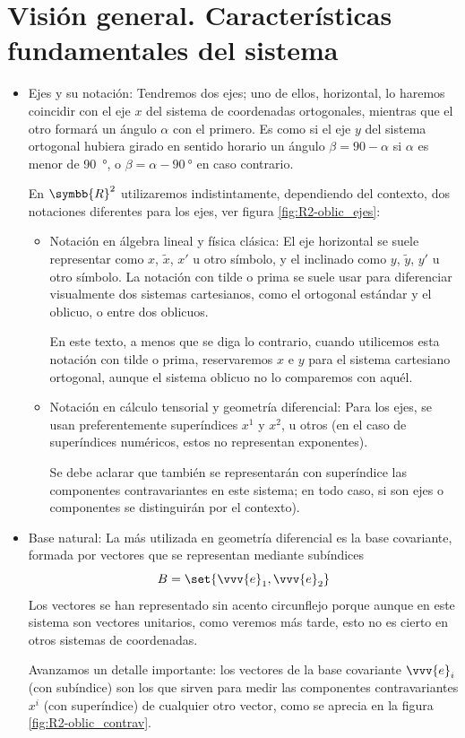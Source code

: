 \section{Visión general. Características fundamentales del sistema}
\label{sect:R2-oblic_vision_general}
\begin{itemize}
\item Ejes y su notación:
  Tendremos dos ejes; uno de ellos, horizontal, lo haremos coincidir con el eje $x$
  del sistema de coordenadas ortogonales, mientras que el otro formará un ángulo $\alpha$
  con el primero. Es como si el eje $y$ del sistema ortogonal hubiera girado en sentido
  horario un ángulo $\beta = \qty{90}-\alpha$ si $\alpha$ es menor de \qty{90}{\degree}, o
  $\beta = \alpha - \qty{90}{\degree}$ en caso contrario.
  
  En $\symbb{R}^2$ utilizaremos indistintamente, dependiendo del contexto, dos
  notaciones diferentes para los ejes, ver figura \ref{fig:R2-oblic_ejes}:
  \begin{itemize}
  \item Notación en álgebra lineal y física clásica:
    El eje horizontal se suele representar como $x$, $\tilde{x}$, $x'$ u otro símbolo, y
    el     inclinado como $y$, $\tilde{y}$, $y'$ u otro símbolo.
    La notación con tilde o prima se suele usar para diferenciar visualmente dos
    sistemas cartesianos, como el ortogonal estándar y el oblicuo, o entre dos oblicuos.
    
    En este texto, a menos que se diga lo contrario, cuando utilicemos esta notación con
    tilde o prima, reservaremos $x$ e $y$ para el sistema cartesiano ortogonal, aunque
    el sistema oblicuo no lo comparemos con aquél.
  \item Notación en cálculo tensorial y geometría diferencial:
    Para los ejes, se usan preferentemente superíndices $x^1$ y $x^2$, u otros
    (en el caso de superíndices numéricos, estos no representan exponentes).
    
    Se debe aclarar que también se representarán con superíndice las componentes
    contravariantes en este sistema; en todo caso, si son ejes o componentes se
    distinguirán por el contexto\footnotemark{}).
  \end{itemize}
\item Base natural:
  La más utilizada en geometría diferencial es la base covariante, formada por vectores
  que se representan mediante subíndices
  \[
    B = \set{\vvv{e}_1, \vvv{e}_2}
  \]
  Los vectores se han representado sin acento circunflejo porque aunque en este sistema
  son vectores unitarios, como veremos más tarde,  esto no es cierto en otros sistemas
  de coordenadas.
  
  Avanzamos un detalle importante: los vectores de la base covariante $\vvv{e}_i$
  (con subíndice) son los que sirven para medir las componentes contravariantes $x^i$
  (con superíndice) de cualquier otro vector, como se aprecia en la figura
  \ref{fig:R2-oblic_contrav}.
\end{itemize}
